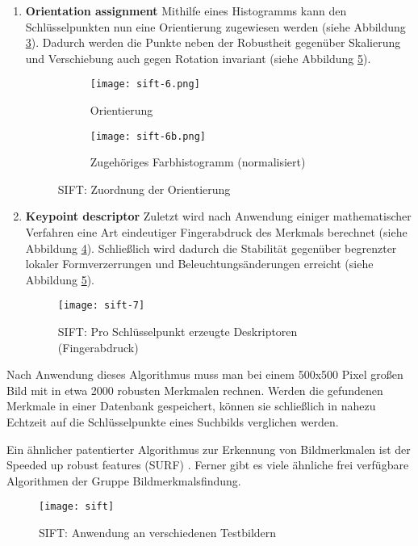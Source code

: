 \begin{enumerate}
    \item \textbf{Orientation assignment}\newline
    Mithilfe eines Histogramms kann den Schlüsselpunkten nun eine Orientierung
    zugewiesen werden (siehe Abbildung \ref{fig:sift-orientation}). Dadurch
    werden die Punkte neben der Robustheit gegenüber Skalierung und Verschiebung
    auch gegen Rotation invariant (siehe Abbildung \ref{fig:sift}).
    \parencite{sift-web-orientation}

    \begin{figure}[H]
        \centering
        \begin{subfigure}{.5\textwidth}
          \centering
          \texttt{[image: sift-6.png]}
          \caption{Orientierung}
          \label{fig:sift6}
        \end{subfigure}%
        \begin{subfigure}{.5\textwidth}
          \centering
          \texttt{[image: sift-6b.png]}
          \caption{Zugehöriges Farbhistogramm (normalisiert)}
          \label{fig:sift6b}
        \end{subfigure}
        \caption{SIFT: Zuordnung der Orientierung}
        \label{fig:sift-orientation}
    \end{figure}

    \item \textbf{Keypoint descriptor}\newline
    Zuletzt wird nach Anwendung einiger mathematischer Verfahren eine Art
    eindeutiger Fingerabdruck des Merkmals berechnet (siehe Abbildung
    \ref{fig:sift7}). Schließlich wird dadurch die Stabilität gegenüber
    begrenzter lokaler Formverzerrungen und Beleuchtungsänderungen erreicht
    (siehe Abbildung \ref{fig:sift}).
    \parencite{sift-web-descriptor}

    \begin{figure}[H]
        \centering
        \texttt{[image: sift-7]}
        \caption{SIFT: Pro Schlüsselpunkt erzeugte Deskriptoren (Fingerabdruck)}
        \label{fig:sift7}
    \end{figure}
\end{enumerate}

Nach Anwendung dieses Algorithmus muss man bei einem 500x500 Pixel großen Bild
mit in etwa 2000 robusten Merkmalen rechnen. Werden die gefundenen Merkmale in
einer Datenbank gespeichert, können sie schließlich in nahezu Echtzeit auf die
Schlüsselpunkte eines Suchbilds verglichen werden.
\parencite{sift-distinctive-features}

Ein ähnlicher patentierter Algorithmus zur Erkennung von Bildmerkmalen ist der
\glqq{}Speeded up robust features (SURF)\grqq{} \parencite{sift-surf}. Ferner
gibt es viele ähnliche frei verfügbare Algorithmen der Gruppe
\glqq{}Bildmerkmalsfindung\grqq{}.

\begin{figure}[H]
    \centering
    \texttt{[image: sift]}
    \caption{SIFT: Anwendung an verschiedenen Testbildern}
    \label{fig:sift}
\end{figure}
